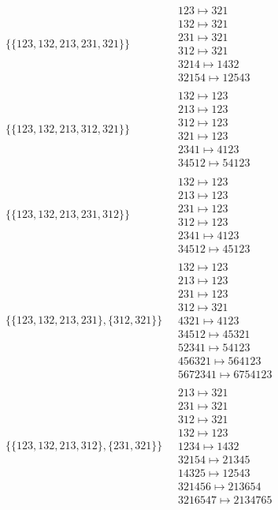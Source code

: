 \begin{scriptsize}
\begin{align}
\\
\{\{123, 132, 213, 231, 321\}\}
\ 
&
\begin{matrix}
123 \mapsto 321\\132 \mapsto 321\\231 \mapsto 321\\312 \mapsto 321\\3214 \mapsto 1432\\32154 \mapsto 12543
\end{matrix}
\\
\{\{123, 132, 213, 312, 321\}\}
\ 
&
\begin{matrix}
132 \mapsto 123\\213 \mapsto 123\\312 \mapsto 123\\321 \mapsto 123\\2341 \mapsto 4123\\34512 \mapsto 54123
\end{matrix}
\\
\{\{123, 132, 213, 231, 312\}\}
\ 
&
\begin{matrix}
132 \mapsto 123\\213 \mapsto 123\\231 \mapsto 123\\312 \mapsto 123\\2341 \mapsto 4123\\34512 \mapsto 45123
\end{matrix}
\\
\{\{123, 132, 213, 231\}, \{312, 321\}\}
\ 
&
\begin{matrix}
132 \mapsto 123\\213 \mapsto 123\\231 \mapsto 123\\312 \mapsto 321\\4321 \mapsto 4123\\34512 \mapsto 45321\\52341 \mapsto 54123\\456321 \mapsto 564123\\5672341 \mapsto 6754123
\end{matrix}
\\
\{\{123, 132, 213, 312\}, \{231, 321\}\}
\ 
&
\begin{matrix}
213 \mapsto 321\\231 \mapsto 321\\312 \mapsto 321\\132 \mapsto 123\\1234 \mapsto 1432\\32154 \mapsto 21345\\14325 \mapsto 12543\\321456 \mapsto 213654\\3216547 \mapsto 2134765

\end{matrix}
\end{align}
\end{scriptsize}
